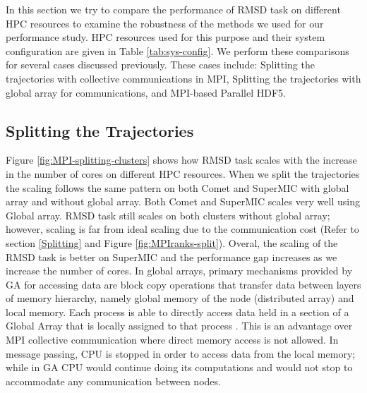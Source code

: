 \label{sec:clusters}
In this section we try to compare the performance of RMSD task on different HPC resources to examine the robustness of the methods we used for our performance study.
HPC resources used for this purpose and their system configuration are given in Table \ref{tab:sys-config}.
We perform these comparisons for several cases discussed previously. 
These cases include: Splitting the trajectories with collective communications in MPI, Splitting the trajectories with global array for communications, and MPI-based Parallel HDF5.

\subsection{Splitting the Trajectories}
Figure \ref{fig:MPI-splitting-clusters} shows how RMSD task scales with the increase in the number of cores on different HPC resources.  
When we split the trajectories the scaling follows the same pattern on both Comet and SuperMIC with global array and without global array.
Both Comet and SuperMIC scales very well using Global array. 
RMSD task still scales on both clusters without global array; however, scaling is far from ideal scaling due to the communication cost (Refer to section \ref{Splitting} and Figure \ref{fig:MPIranks-split}). 
Overal, the scaling of the RMSD task is better on SuperMIC and the performance gap increases as we increase the number of cores.
In global arrays, primary mechanisms provided by GA for accessing data are block copy operations that transfer data between layers of memory hierarchy, namely global memory of the node (distributed array) and local memory. 
Each process is able to directly access data held in a section of a Global Array that is locally assigned to that process \cite{GA}.
This is an advantage over MPI collective communication where direct memory access is not allowed. 
In message passing, CPU is stopped in order to access data from the local memory; while in GA CPU would continue doing its computations and would not stop to accommodate any communication between
nodes.

